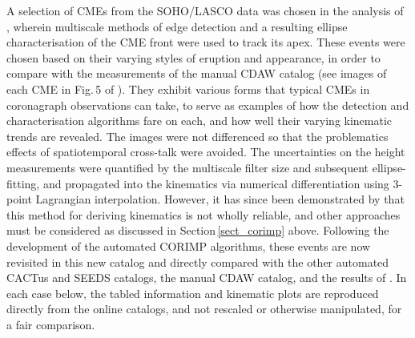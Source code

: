 \documentclass[referee,a4paper,12pt,traditabstract]{swsc}
\begin{document}
\begin{linenumbers}
A selection of CMEs from the SOHO/LASCO data was chosen in the analysis of \cite{2009A&A...495..325B}, wherein multiscale methods of edge detection and a resulting ellipse characterisation of the CME front were used to track its apex. These events were chosen based on their varying styles of eruption and appearance, in order to compare with the measurements of the manual CDAW catalog (see images of each CME in Fig.\,5 of \citealt{2009A&A...495..325B}). They exhibit various forms that typical CMEs in coronagraph observations can take, to serve as examples of how the detection and characterisation algorithms fare on each, and how well their varying kinematic trends are revealed. The images were not differenced so that the problematics effects of spatiotemporal cross-talk were avoided. The uncertainties on the height measurements were quantified by the multiscale filter size and subsequent ellipse-fitting, and propagated into the kinematics via numerical differentiation using 3-point Lagrangian interpolation. However, it has since been demonstrated by \cite{2013A&A...557A..96B} that this method for deriving kinematics is not wholly reliable, and other approaches must be considered as discussed in Section\,\ref{sect_corimp} above. Following the development of the automated CORIMP algorithms, these events are now revisited in this new catalog and directly compared with the other automated CACTus and SEEDS catalogs, the manual CDAW catalog, and the results of \cite{2009A&A...495..325B}. In each case below, the tabled information and kinematic plots are reproduced directly from the online catalogs, and not rescaled or otherwise manipulated, for a fair comparison.





\end{linenumbers}
\end{document}
